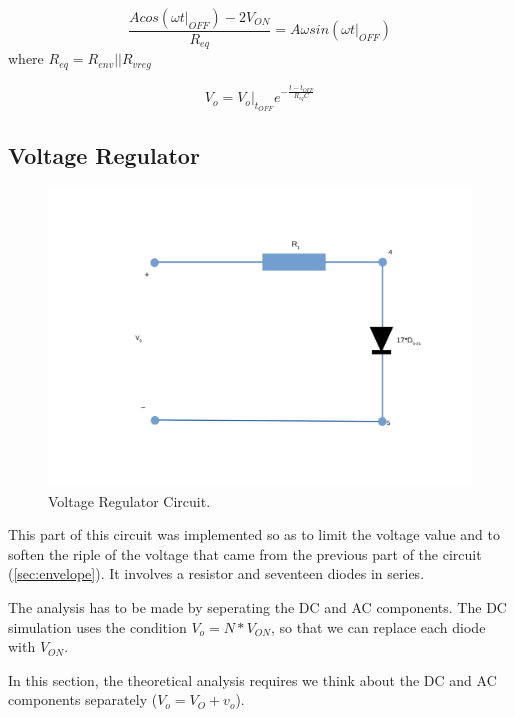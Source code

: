 
\begin{equation}
    \frac{Acos(\omega t|_{OFF})-2V_{ON}}{R_{eq}}=A\omega sin(\omega t|_{OFF})
\end{equation}
where $R_{eq}=R_{env}||R_{vreg}$

\begin{equation}
    V_o=V_o|_{t_{OFF}}e^{-\frac{t-t_{OFF}}{R_{eq}C}}
\end{equation}


\subsection{Voltage Regulator}
\label{sec:regulator}

\begin{figure}[h]
    \centering
    \includegraphics[scale=0.5]{voltageregulator.pdf}
    \caption{Voltage Regulator Circuit.}
    \label{fig:Regulator}
\end{figure}

This part of this circuit was implemented so as to limit the voltage value and to soften the riple of the voltage that came from the previous part of the circuit (\ref{sec:envelope}). It involves a resistor and seventeen diodes in series.


The analysis has to be made by seperating the DC and AC components. The DC simulation uses the condition $V_o=N * V_{ON}$, so that we can replace each diode with $V_{ON}$. 

In this section, the theoretical analysis requires we think about the DC and AC components separately ($V_o=V_O+v_o$). 


